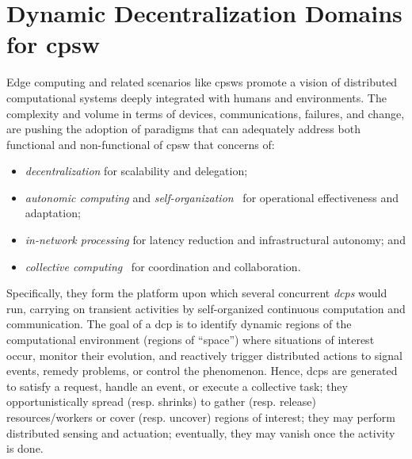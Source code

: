 \newcommand{\casename}[0]{{\sc{}FloodWatch}}


\newcommand{\revise}[1]{{#1}}
\newcommand{\revisetwo}[1]{{#1}}


\chapter[Dynamic Decentralization Domains]{Dynamic Decentralization Domains for \acf{cpsw}}\label{chap:eng:decentralization}%
\minitoc%
Edge computing
 and related scenarios
 like \acp{cpsw}
 promote a vision of
 distributed computational systems 
 deeply integrated with
 humans and environments.
% 
%
The complexity and volume in terms of devices, communications, failures, and change,
 are pushing the adoption of paradigms 
 that can %
 adequately address both functional
 and non-functional of \ac{cpsw} that concerns of:
\begin{itemize}
  \item \emph{decentralization} for scalability and delegation;
  \item \emph{autonomic computing} and \emph{self-organization}~\cite{DBLP:journals/computer/KephartC03} for operational effectiveness and adaptation;
  \item \emph{in-network processing} for latency reduction and infrastructural autonomy; and
  \item \emph{collective computing}~\cite{DBLP:journals/eaai/CasadeiVAPD21} for coordination and collaboration.
\end{itemize}

Specifically, they form the platform %
 upon which several concurrent
 \emph{\acp{dcp}} 
 would run, carrying on transient activities
 by self-organized continuous computation and communication. %
%
The goal of a \ac{dcp} is to identify dynamic regions of the computational environment (regions of ``space'') where
situations of interest occur,
monitor their evolution,
and reactively trigger distributed actions to signal events,
remedy problems,
or control the phenomenon.
%
Hence, \acp{dcp}
 are generated
 to satisfy a request,
 handle an event, or 
 execute a collective task;
 they opportunistically spread (resp. shrinks)
 to gather (resp. release) resources/workers
 or cover (resp. uncover) regions of interest;
 they may perform 
 distributed sensing and actuation;
eventually, they may vanish once the activity is done.
 
